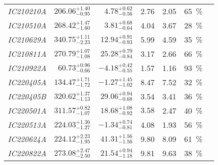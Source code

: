 \begin{table*}
\begin{tabular}{l r r r r c c}
    \emph{IC210210A} & $206.06^{+1.40}_{-0.95}$ & $4.78^{+0.62}_{-0.56}$   & 2.76                 & 2.05                 & \SI{65}{\percent}  & \cite{IC210210A1, IC210210A2}                         \\
    \emph{IC210510A} & $268.42^{+1.47}_{-1.60}$ & $3.81^{+0.68}_{-0.64}$   & 4.04                 & 3.67                 & \SI{28}{\percent}  & \cite{IC210510A1, IC210510A2}                         \\
    \emph{IC210629A} & $340.75^{+1.11}_{-2.23}$ & $12.94^{+0.91}_{-0.93}$  & 5.99                 & 4.59                 & \SI{35}{\percent}  & \cite{IC210629A1, IC210629A2, IC210629A3}             \\
    \emph{IC210811A} & $270.79^{+1.07}_{-1.08}$ & $25.28^{+0.79}_{-0.84}$  & 3.17                 & 2.66                 & \SI{66}{\percent}  & \cite{IC210811A1, IC210811A2}                         \\
    \emph{IC210922A} & $60.73^{+0.96}_{-0.66}$  & $-4.18^{+0.42}_{-0.55}$  & 1.57                 & 1.16                 & \SI{93}{\percent}  & \cite{IC210922A1, IC210922A2}                         \\
    \emph{IC220405A} & $134.47^{+1.71}_{-1.72}$ & $-1.27^{+1.45}_{-1.02}$  & 8.47                 & 7.52                 & \SI{32}{\percent}  & \cite{IC220405A1, IC220405A2}                         \\
    \emph{IC220405B} & $320.62^{+1.37}_{-1.13}$ & $29.06^{+0.94}_{-0.68}$  & 3.54                 & 3.41                 & \SI{36}{\percent}  & \cite{IC220405B1, IC220405A2}                         \\
    \emph{IC220501A} & $311.57^{+0.82}_{-1.07}$ & $18.68^{+1.08}_{-0.92}$  & $3.58$               & 2.47                 & \SI{40}{\percent}  & \cite{IC220501A1, IC220501A2}                         \\
    \emph{IC220513A} & $224.03^{+1.36}_{-1.27}$ & $-1.34^{+0.74}_{-0.81}$  & 4.08                 & 1.93                 & \SI{56}{\percent}  & \cite{IC220513A1, IC220513A2}                         \\
    \emph{IC220624A} & $224.12^{+2.23}_{-1.95}$ & $41.31^{+1.56}_{-1.56}$  & 9.80                 & 8.09                 & \SI{61}{\percent}  & \cite{IC220624A1, IC220624A2}                         \\
    \emph{IC220822A} & $273.08^{+2.47}_{-2.50}$ & $21.54^{+0.94}_{-1.18}$  & 9.81                 & 9.63                 & \SI{38}{\percent}  & \cite{IC220822A1, IC220822A2}                         \\

\end{tabular}
\end{table*}
